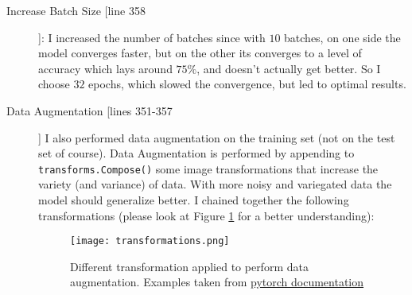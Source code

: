 \documentclass[a4paper]{article}
\begin{document}
\begin{enumerate}
\begin{description}
\item[Increase Batch Size [line 358]]: I increased the number of batches since with $10$ batches, on one side the model converges faster, but on the other its converges to a level of accuracy which lays around $75\%$, and doesn't actually get better. So I choose $32$ epochs, which slowed the convergence, but led to optimal results. 
\item[Data Augmentation [lines 351-357]] I also performed data augmentation on the training set (not on the test set of course). Data Augmentation is performed by appending to \texttt{transforms.Compose()} some image transformations that increase the variety (and variance) of data. With more noisy and variegated data the model should generalize better. I chained together the following transformations (please look at Figure \ref{fig:transf} for a better understanding):

        \begin{figure}[h]
            \centering
            \texttt{[image: transformations.png]}
            \caption{Different transformation applied to perform data augmentation. Examples taken from \href{https://pytorch.org/vision/main/auto_examples/transforms/plot_transforms_illustrations.html#sphx-glr-auto-examples-transforms-plot-transforms-illustrations-py}{pytorch documentation}}
            \label{fig:transf}
        \end{figure}


\end{description}
\end{enumerate}
\end{document}
